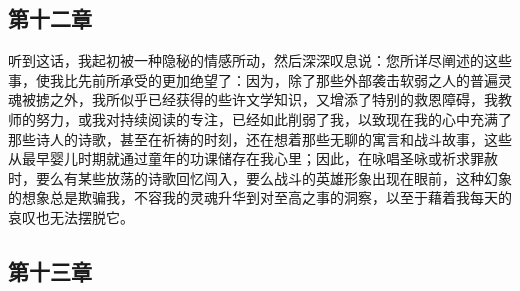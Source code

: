 \subsection{第十二章}

\par

听到这话，我起初被一种隐秘的情感所动，然后深深叹息说：您所详尽阐述的这些事，使我比先前所承受的更加绝望了：因为，除了那些外部袭击软弱之人的普遍灵魂被掳之外，我所似乎已经获得的些许文学知识，又增添了特别的救恩障碍，我教师的努力，或我对持续阅读的专注，已经如此削弱了我，以致现在我的心中充满了那些诗人的诗歌，甚至在祈祷的时刻，还在想着那些无聊的寓言和战斗故事，这些从最早婴儿时期就通过童年的功课储存在我心里；因此，在咏唱圣咏或祈求罪赦时，要么有某些放荡的诗歌回忆闯入，要么战斗的英雄形象出现在眼前，这种幻象的想象总是欺骗我，不容我的灵魂升华到对至高之事的洞察，以至于藉着我每天的哀叹也无法摆脱它。\par


\subsection{第十三章}

\par

